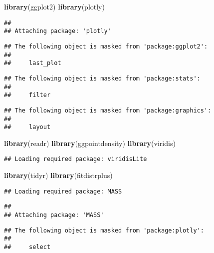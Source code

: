 \documentclass[
]{article}
\newenvironment{Shaded}{\begin{snugshade}}{\end{snugshade}}
\newcommand{\FunctionTok}[1]{\textcolor[rgb]{0.13,0.29,0.53}{\textbf{#1}}}
\newcommand{\NormalTok}[1]{#1}
\begin{document}
\begin{Shaded}
\begin{Highlighting}[]
\FunctionTok{library}\NormalTok{(ggplot2)}
\FunctionTok{library}\NormalTok{(plotly)}
\end{Highlighting}
\end{Shaded}

\begin{verbatim}
## 
## Attaching package: 'plotly'
\end{verbatim}

\begin{verbatim}
## The following object is masked from 'package:ggplot2':
## 
##     last_plot
\end{verbatim}

\begin{verbatim}
## The following object is masked from 'package:stats':
## 
##     filter
\end{verbatim}

\begin{verbatim}
## The following object is masked from 'package:graphics':
## 
##     layout
\end{verbatim}

\begin{Shaded}
\begin{Highlighting}[]
\FunctionTok{library}\NormalTok{(readr)}
\FunctionTok{library}\NormalTok{(ggpointdensity)}
\FunctionTok{library}\NormalTok{(viridis)}
\end{Highlighting}
\end{Shaded}

\begin{verbatim}
## Loading required package: viridisLite
\end{verbatim}

\begin{Shaded}
\begin{Highlighting}[]
\FunctionTok{library}\NormalTok{(tidyr)}
\FunctionTok{library}\NormalTok{(fitdistrplus)}
\end{Highlighting}
\end{Shaded}

\begin{verbatim}
## Loading required package: MASS
\end{verbatim}

\begin{verbatim}
## 
## Attaching package: 'MASS'
\end{verbatim}

\begin{verbatim}
## The following object is masked from 'package:plotly':
## 
##     select
\end{verbatim}
\end{document}
